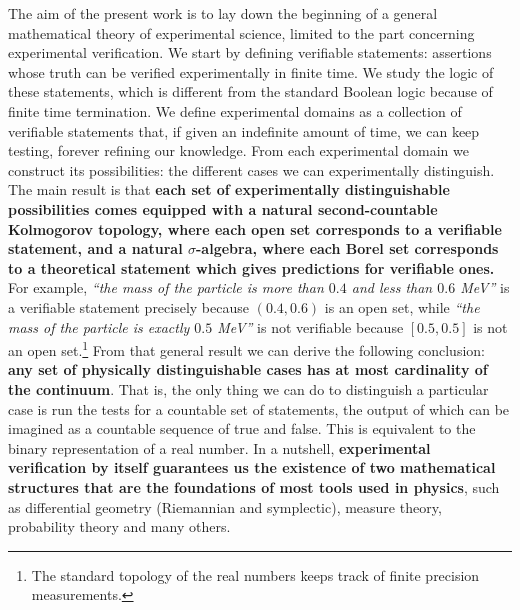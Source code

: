 \documentclass[letterpaper]{article}
\theoremstyle{plain}%
\theoremstyle{definition}
\theoremstyle{remark}
\numberwithin{equation}{section}
\newcommand{\statement}[1] {\emph{``#1''}}
\begin{document}
The aim of the present work is to lay down the beginning of a general mathematical theory of experimental science, limited to the part concerning experimental verification. We start by defining verifiable statements: assertions whose truth can be verified experimentally in finite time. We study the logic of these statements, which is different from the standard Boolean logic because of finite time termination. We define experimental domains as a collection of verifiable statements that, if given an indefinite amount of time, we can keep testing, forever refining our knowledge. From each experimental domain we construct its possibilities: the different cases we can experimentally distinguish. The main result is that \textbf{each set of experimentally distinguishable possibilities comes equipped with a natural second-countable Kolmogorov topology, where each open set corresponds to a verifiable statement, and a natural $\sigma$-algebra, where each Borel set corresponds to a theoretical statement which gives predictions for verifiable ones.} For example, \statement{the mass of the particle is more than $0.4$ and less than $0.6$ MeV} is a verifiable statement precisely because $(0.4, 0.6)$ is an open set, while \statement{the mass of the particle is exactly $0.5$ MeV} is not verifiable because $[0.5,0.5]$ is not an open set.\footnote{The standard topology of the real numbers keeps track of finite precision measurements.} From that general result we can derive the following conclusion: \textbf{any set of physically distinguishable cases has at most cardinality of the continuum}. That is, the only thing we can do to distinguish a particular case is run the tests for a countable set of statements, the output of which can be imagined as a countable sequence of true and false. This is equivalent to the binary representation of a real number. In a nutshell, \textbf{experimental verification by itself guarantees us the existence of two mathematical structures that are the foundations of most tools used in physics}, such as differential geometry (Riemannian and symplectic), measure theory, probability theory and many others.

\end{document}
